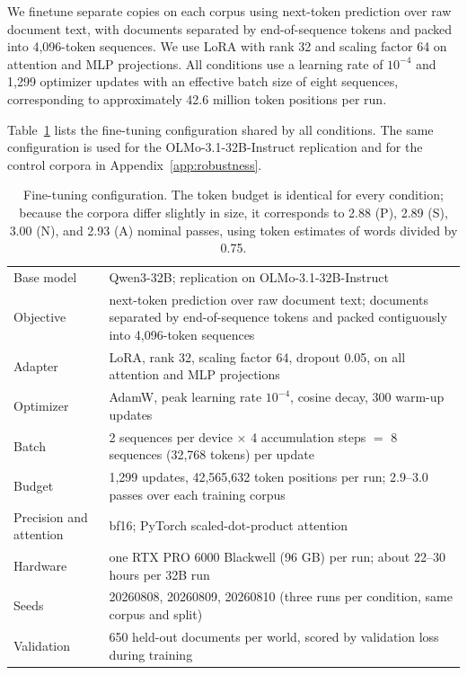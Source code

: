 \documentclass{article} %
\begin{document}
We finetune separate copies on each corpus using next-token prediction over raw document text, with documents separated by end-of-sequence tokens and packed into 4,096-token sequences. We use LoRA \citep{hu2021lora} with rank 32 and scaling factor 64 on attention and MLP projections. All conditions use a learning rate of $10^{-4}$ and 1,299 optimizer updates with an effective batch size of eight sequences, corresponding to approximately 42.6 million token positions per run.

Table~\ref{tab:training-hparams} lists the fine-tuning configuration shared by all conditions. The same configuration is used for the OLMo-3.1-32B-Instruct replication and for the control corpora in Appendix~\ref{app:robustness}.

\begin{table}[htbp]
\centering\small
\begin{tabular}{@{}lp{9.2cm}@{}}
\toprule
Base model & Qwen3-32B; replication on OLMo-3.1-32B-Instruct \\
Objective & next-token prediction over raw document text; documents separated by end-of-sequence tokens and packed contiguously into 4,096-token sequences \\
Adapter & LoRA, rank 32, scaling factor 64, dropout 0.05, on all attention and MLP projections \\
Optimizer & AdamW, peak learning rate $10^{-4}$, cosine decay, 300 warm-up updates \\
Batch & 2 sequences per device $\times$ 4 accumulation steps $=$ 8 sequences (32,768 tokens) per update \\
Budget & 1,299 updates, 42,565,632 token positions per run; 2.9--3.0 passes over each training corpus \\
Precision and attention & bf16; PyTorch scaled-dot-product attention \\
Hardware & one RTX PRO 6000 Blackwell (96 GB) per run; about 22--30 hours per 32B run \\
Seeds & 20260808, 20260809, 20260810 (three runs per condition, same corpus and split) \\
Validation & 650 held-out documents per world, scored by validation loss during training \\
\bottomrule
\end{tabular}
\caption{Fine-tuning configuration. The token budget is identical for every condition; because the corpora differ slightly in size, it corresponds to 2.88 (P), 2.89 (S), 3.00 (N), and 2.93 (A) nominal passes, using token estimates of words divided by 0.75.}
\label{tab:training-hparams}
\end{table}
\end{document}
